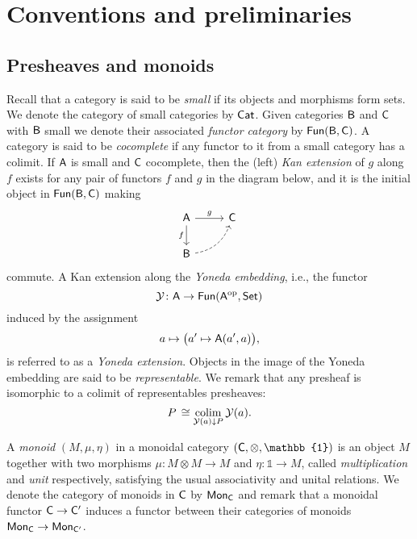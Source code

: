 
\section{Conventions and preliminaries} \label{s:preliminaries}

\subsection{Presheaves and monoids}

Recall that a category is said to be \textit{small} if its objects and morphisms form sets.
We denote the category of small categories by $\mathsf{Cat}$.
Given categories $\mathsf{B}$ and $\mathsf{C}$ with $\mathsf{B}$ small we denote their associated \textit{functor category} by $\mathsf{Fun}(\mathsf{B}, \mathsf{C})$.
A category is said to be \textit{cocomplete} if any functor to it from a small category has a colimit.
If $\mathsf{A}$ is small and $\mathsf{C}$ cocomplete, then the (left) \textit{Kan extension} of $g$ along $f$ exists for any pair of functors $f$ and $g$ in the diagram below, and it is the initial object in $\mathsf{Fun}(\mathsf{B}, \mathsf{C})$ making
\begin{equation*}
	\begin{tikzcd}[column sep=normal, row sep=normal]
		\sA \arrow[d, "f"'] \arrow[r, "g"] & \sC \\
		\sB \arrow[dashed, ur, bend right] & \quad
	\end{tikzcd}
\end{equation*}
commute.
A Kan extension along the \textit{Yoneda embedding}, i.e., the functor
\[
\operatorname{\mathcal{Y}} \colon \mathsf{A} \to \mathsf{Fun}(\mathsf{A}^{\mathrm{op}}, \mathsf{Set})
\]
induced by the assignment
\[
a \mapsto \big( a^\prime \mapsto \mathsf{A}(a^\prime, a) \big),
\]
is referred to as a \textit{Yoneda extension}.
Objects in the image of the Yoneda embedding are said to be \textit{representable}.
We remark that any presheaf is isomorphic to a colimit of representables presheaves:
\[
P \, \cong \operatorname*{colim}_{\operatorname{\mathcal{Y}}(a) \downarrow P} \operatorname{\mathcal{Y}}(a).
\]

A \textit{monoid} $(M, \mu, \eta)$ in a monoidal category $(\sC, \otimes, \mathbb{1})$ is an object $M$ together with two morphisms $\mu \colon M \otimes M \to M$ and $\eta \colon \mathbb{1} \to M$, called \textit{multiplication} and \textit{unit} respectively, satisfying the usual associativity and unital relations.
We denote the category of monoids in $\mathsf{C}$ by $\mathsf{Mon}_{\mathsf{C}}$ and remark that a monoidal functor $\mathsf{C} \to \mathsf{C}^\prime$ induces a functor between their categories of monoids $\mathsf{Mon}_{\mathsf{C}} \to \mathsf{Mon}_{\mathsf{C}^\prime}$.

